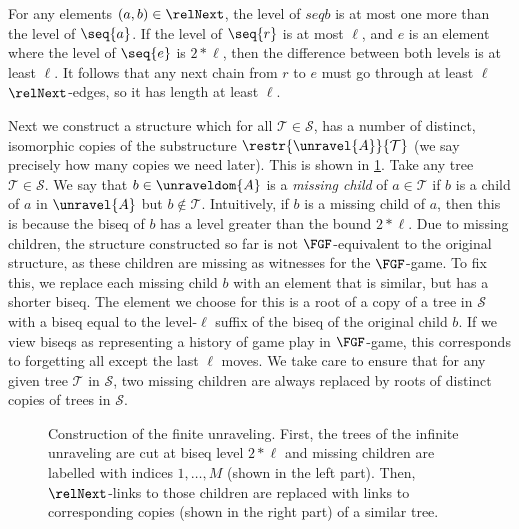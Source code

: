 \begin{proofsketch}
  For any elements $(a,b) \in \relNext$, the level of $seq{b}$ is at most one more than the level of $\seq{a}$.
  If the level of $\seq{r}$ is at most $\ell$, and $e$ is an element where the level of $\seq{e}$ is $2 * \ell$, then the difference between both levels is at least $\ell$.
  It follows that any next chain from $r$ to $e$ must go through at least $\ell$ $\relNext$-edges, so it has length at least $\ell$.
\end{proofsketch}
Next we construct a structure which for all $\mathcal{T} \in \mathcal{S}$, has a number of distinct, isomorphic copies of the substructure $\restr{\unravel{A}}{\mathcal{T}}$ (we say precisely how many copies we need later).
This is shown in \cref{fig:finite-unraveling}.
Take any tree $\mathcal{T} \in \mathcal{S}$.
We say that $b \in \unraveldom{A}$ is a \emph{missing child} of $a \in \mathcal{T}$ if $b$ is a child of $a$ in $\unravel{A}$ but $b \notin \mathcal{T}$.
Intuitively, if $b$ is a missing child of $a$, then this is because the biseq of $b$ has a level greater than the bound $2 * \ell$.
Due to missing children, the structure constructed so far is not $\FGF$-equivalent to the original structure, as these children are missing as witnesses for the $\FGF$-game.
To fix this, we replace each missing child $b$ with an element that is similar, but has a shorter biseq.
The element we choose for this is a root of a copy of a tree in $\mathcal{S}$ with a biseq equal to the level-$\ell$ suffix of the biseq of the original child $b$.
If we view biseqs as representing a history of game play in $\FGF$-game, this corresponds to forgetting all except the last $\ell$ moves.
We take care to ensure that for any given tree $\mathcal{T}$ in $\mathcal{S}$, two missing children are always replaced by roots of distinct copies of trees in $\mathcal{S}$.

\begin{figure}
  \centering
  
  \caption{Construction of the finite unraveling. First, the trees of the infinite unraveling are cut at biseq level $2*\ell$ and missing children are labelled with indices $1, \ldots, M$ (shown in the left part). Then, $\relNext$-links to those children are replaced with links to corresponding copies (shown in the right part) of a similar tree.}
  \label{fig:finite-unraveling}
\end{figure}

